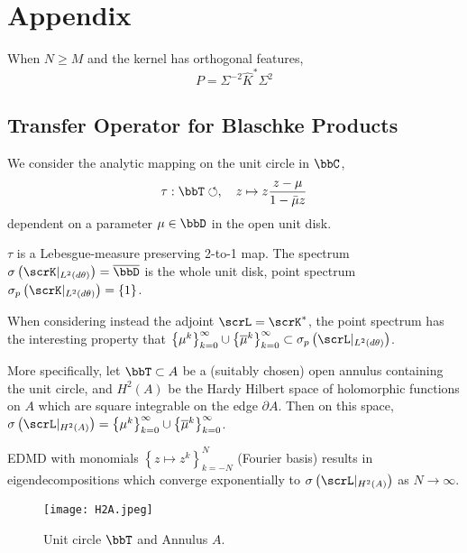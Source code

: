 
\section{Appendix}

When $N \geq M$ and the kernel has orthogonal features, 
\begin{equation}
    P = \Sigma^{-2} \widehat{ K }^* \Sigma^2
\end{equation}

\subsection{Transfer Operator for Blaschke Products}

We consider the analytic mapping on the unit circle in $\bbC$, 
\begin{equation*}
    \tau : \bbT \circlearrowleft, \quad z \mapsto z \frac{z - \mu}{1 - \bar{\mu} z} 
\end{equation*}
dependent on a parameter $\mu \in \bbD$ in the open unit disk. 

$\tau$ is a Lebesgue-measure preserving 2-to-1 map. The spectrum 
$\sigma \left( \scrK \vert_{L^2 (d\theta)} \right) = \overline{\bbD}$ is the whole unit 
disk, point spectrum 
$\sigma_p \left( \scrK \vert_{L^2 (d\theta)} \right) = \left\{ 1 \right\}$. 

When considering instead the adjoint $\scrL = \scrK^*$, the point spectrum has the 
interesting property that 
$\left\{ \mu^k \right\}_{k=0}^\infty \cup \left\{ \overline{\mu}^k \right\}_{k=0}^\infty \subset \sigma_p \left( \scrL \vert_{L^2 (d\theta)} \right)$. 

More specifically, let $\bbT \subset A$ be a (suitably chosen) open annulus containing the 
unit circle, and $H^2 (A)$ be the Hardy Hilbert space of holomorphic functions on $A$ which 
are square integrable on the edge $\partial A$. Then on this space, 
$\sigma \left( \scrL \vert_{H^2 (A)} \right) = \left\{ \mu^k \right\}_{k=0}^\infty \cup \left\{ \overline{\mu}^k \right\}_{k=0}^\infty$. 

EDMD with monomials $\left\{ z \mapsto z^k \right\}_{k=-N}^N$ (Fourier basis) results in 
eigendecompositions which converge exponentially to 
$\sigma \left( \scrL \vert_{H^2 (A)} \right)$ as $N \to \infty$. 


\begin{figure}
    \texttt{[image: H2A.jpeg]}
    \caption{
        Unit circle $\bbT$ and Annulus $A$. 
    }
\end{figure}

